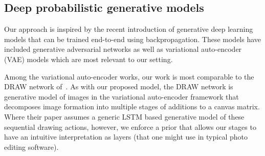 

\subsection{Deep probabilistic generative models}

Our approach is inspired by the recent introduction of generative deep learning models that can be
trained end-to-end using backpropagation.  These models have included
generative adversarial networks \citep{denton2015deep, goodfellow2014generative}
as well as variational auto-encoder (VAE) models \citep{Kingma2014,kingma2014semi,rezende2014stochastic,burda2015importance}
which are most relevant to our setting.  

Among the variational auto-encoder works, our work is most comparable to 
the DRAW network of~\cite{gregor2015draw}.  As with our proposed model, 
the DRAW network is generative model of images in the variational auto-encoder framework
that decomposes image formation into multiple stages of additions to a canvas matrix.  
Where their paper assumes a generic LSTM based generative model of these sequential 
drawing actions, however, we enforce a prior that allows our stages to have an intuitive interpretation
as layers (that one might use in typical photo editing software).


		
	

